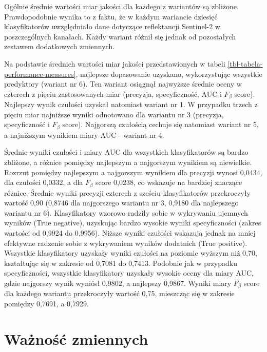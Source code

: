 \documentclass{amuthesis}
\begin{document}
Ogólnie średnie wartości miar jakości dla każdego z wariantów są
zbliżone. Prawdopodobnie wynika to z faktu, że w każdym wariancie
dziesięć klasyfikatorów uwzględniało dane dotyczące reflektancji
Sentinel-2 w poszczególnych kanałach. Każdy wariant różnił się jednak od
pozostałych zestawem dodatkowych zmiennych.

Na podstawie średnich wartości miar jakości przedstawionych w tabeli
\ref{tbl-tabela-performance-measures}, najlepsze dopasowanie uzyskano,
wykorzystując wszystkie predyktory (wariant nr 6). Ten wariant osiągnął
najwyższe średnie oceny w czterech z pięciu zastosowanych miar
(precyzja, specyficzność, AUC i \(F_{\beta}\) score). Najlepszy wynik
czułości uzyskał natomiast wariant nr 1. W przypadku trzech z pięciu
miar najniższe wyniki odnotowano dla wariantu nr 3 (precyzja,
specyficzność i \(F_{\beta}\) score). Najgorszą czułością cechuje się
natomiast wariant nr 5, a najniższym wynikiem miary AUC - wariant nr 4.

Średnie wyniki czułości i miary AUC dla wszystkich klasyfikatorów są
bardzo zbliżone, a różnice pomiędzy najlepszym a najgorszym wynikiem są
niewielkie. Rozrzut pomiędzy najlepszym a najgorszym wynikiem dla
precyzji wynosi 0,0434, dla czułości 0,0332, a dla \(F_{\beta}\) score
0,0238, co wskazuje na bardziej znaczące różnice. Średnie wyniki
precyzji czterech z sześciu klasyfikatorów przekroczyły wartość 0,90
(0,8746 dla najgorszego wariantu nr 3, 0,9180 dla najlepszego wariantu
nr 6). Klasyfikatory wzorowo radziły sobie w wykrywaniu ujemnych wyników
(True negative), uzyskując bardzo wysokie wyniki specyficzności (zakres
wartości od 0,9924 do 0,9956). Niższe wyniki czułości wskazują jednak na
mniej efektywne radzenie sobie z wykrywaniem wyników dodatnich (True
positive). Wszystkie klasyfikatory uzyskały wyniki czułości na poziomie
wyższym niż 0,70, kształtując się w zakresie od 0,7081 do 0,7413.
Podobnie jak w przypadku specyficzności, wszystkie klasyfikatory
uzyskały wysokie oceny dla miary AUC, gdzie najgorszy wynik wyniósł
0,9802, a najlepszy 0,9867. Wyniki miary \(F_{\beta}\) score dla każdego
wariantu przekroczyły wartość 0,75, mieszcząc się w zakresie pomiędzy
0,7691, a 0,7929.

\hypertarget{waux17cnoux15bux107-zmiennych}{%
\section{Ważność zmiennych}\label{waux17cnoux15bux107-zmiennych}}
\end{document}
